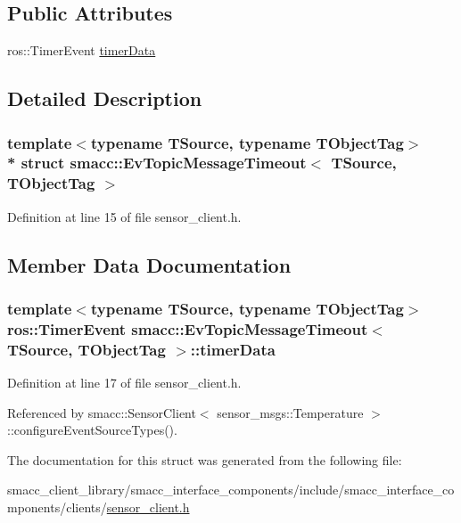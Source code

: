 \subsection*{Public Attributes}
\begin{DoxyCompactItemize}
\item 
ros\+::\+Timer\+Event \hyperlink{structsmacc_1_1EvTopicMessageTimeout_ad2609ece9742ef84c32160309b1b0f15}{timer\+Data}
\end{DoxyCompactItemize}


\subsection{Detailed Description}
\subsubsection*{template$<$typename T\+Source, typename T\+Object\+Tag$>$\\*
struct smacc\+::\+Ev\+Topic\+Message\+Timeout$<$ T\+Source, T\+Object\+Tag $>$}



Definition at line 15 of file sensor\+\_\+client.\+h.



\subsection{Member Data Documentation}
\subsubsection[{\texorpdfstring{timer\+Data}{timerData}}]{\setlength{\rightskip}{0pt plus 5cm}template$<$typename T\+Source, typename T\+Object\+Tag$>$ ros\+::\+Timer\+Event {\bf smacc\+::\+Ev\+Topic\+Message\+Timeout}$<$ T\+Source, T\+Object\+Tag $>$\+::timer\+Data}\hypertarget{structsmacc_1_1EvTopicMessageTimeout_ad2609ece9742ef84c32160309b1b0f15}{}\label{structsmacc_1_1EvTopicMessageTimeout_ad2609ece9742ef84c32160309b1b0f15}


Definition at line 17 of file sensor\+\_\+client.\+h.



Referenced by smacc\+::\+Sensor\+Client$<$ sensor\+\_\+msgs\+::\+Temperature $>$\+::configure\+Event\+Source\+Types().



The documentation for this struct was generated from the following file\+:\begin{DoxyCompactItemize}
\item 
smacc\+\_\+client\+\_\+library/smacc\+\_\+interface\+\_\+components/include/smacc\+\_\+interface\+\_\+components/clients/\hyperlink{sensor__client_8h}{sensor\+\_\+client.\+h}\end{DoxyCompactItemize}
